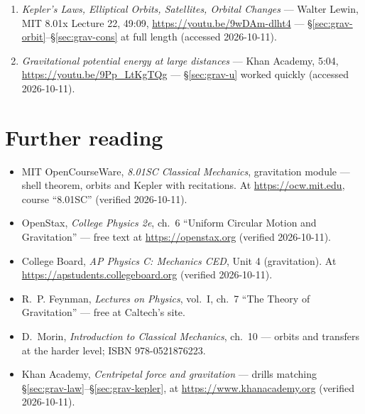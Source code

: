 
\begin{rulebox}
\begin{enumerate}
\item \emph{Kepler's Laws, Elliptical Orbits, Satellites, Orbital Changes}
--- Walter Lewin, MIT 8.01x Lecture 22, 49:09,
\url{https://youtu.be/9wDAm-dlht4} ---
\S\ref{sec:grav-orbit}--\S\ref{sec:grav-cons} at full length (accessed
2026-10-11).
\item \emph{Gravitational potential energy at large distances} --- Khan
Academy, 5:04, \url{https://youtu.be/9Pp_LtKgTQg} ---
\S\ref{sec:grav-u} worked quickly (accessed 2026-10-11).
\end{enumerate}
\end{rulebox}

\section*{Further reading}

\begin{itemize}
\item MIT OpenCourseWare, \emph{8.01SC Classical Mechanics}, gravitation
module --- shell theorem, orbits and Kepler with recitations. At
\url{https://ocw.mit.edu}, course ``8.01SC'' (verified 2026-10-11).
\item OpenStax, \emph{College Physics 2e}, ch.~6 ``Uniform Circular
Motion and Gravitation'' --- free text at \url{https://openstax.org}
(verified 2026-10-11).
\item College Board, \emph{AP Physics C: Mechanics CED}, Unit 4
(gravitation). At \url{https://apstudents.collegeboard.org} (verified
2026-10-11).
\item R.~P. Feynman, \emph{Lectures on Physics}, vol.~I, ch.~7 ``The
Theory of Gravitation'' --- free at Caltech's site.
\item D.~Morin, \emph{Introduction to Classical Mechanics}, ch.~10 ---
orbits and transfers at the harder level; ISBN 978-0521876223.
\item Khan Academy, \emph{Centripetal force and gravitation} --- drills
matching \S\ref{sec:grav-law}--\S\ref{sec:grav-kepler}, at
\url{https://www.khanacademy.org} (verified 2026-10-11).
\end{itemize}

